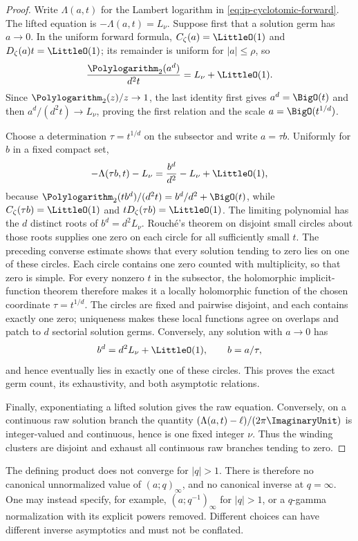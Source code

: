 \begin{proof}
Write \(\Lambda(a,t)\) for the Lambert logarithm in
\cref{eq:ip-cyclotomic-forward}.  The lifted equation is
\(-\Lambda(a,t)=L_\nu\).  Suppose first that a solution germ has
\(a\to0\).  In the uniform forward formula,
\(C_\zeta(a)=\LittleO(1)\) and \(D_\zeta(a)t=\LittleO(1)\); its remainder is
uniform for \(|a|\leq\rho\), so
\[
 \frac{\Polylogarithm_2(a^d)}{d^2t}=L_\nu+\LittleO(1).
\]
Since \(\Polylogarithm_2(z)/z\to1\), the last identity first gives
\(a^d=\BigO(t)\) and then
\(a^d/(d^2t)\to L_\nu\), proving the first relation and the scale
\(a=\BigO(t^{1/d})\).

Choose a determination \(\tau=t^{1/d}\) on the subsector and write
\(a=\tau b\).  Uniformly for \(b\) in a fixed compact set,
\[
 -\Lambda(\tau b,t)-L_\nu
 =\frac{b^d}{d^2}-L_\nu+\LittleO(1),
\]
because
\(\Polylogarithm_2(tb^d)/(d^2t)=b^d/d^2+\BigO(t)\), while
\(C_\zeta(\tau b)=\LittleO(1)\) and
\(tD_\zeta(\tau b)=\LittleO(1)\).  The limiting polynomial has the
\(d\) distinct roots of \(b^d=d^2L_\nu\).  Rouché's theorem on disjoint
small circles about those roots supplies one zero on each circle for all
sufficiently small \(t\).  The preceding converse estimate shows that every
solution tending to zero lies on one of these circles.  Each circle contains
one zero counted with multiplicity, so that zero is simple.  For every
nonzero \(t\) in the subsector, the holomorphic implicit-function theorem
therefore makes it a locally holomorphic function of the chosen coordinate
\(\tau=t^{1/d}\).  The circles are fixed and pairwise disjoint, and each
contains exactly one zero; uniqueness makes these local functions agree on
overlaps and patch to \(d\) sectorial solution germs.  Conversely, any
solution with \(a\to0\) has
\[
 b^d=d^2L_\nu+\LittleO(1),\qquad b=a/\tau,
\]
and hence eventually lies in exactly one of these circles.  This proves the
exact germ count, its exhaustivity, and both asymptotic relations.

Finally, exponentiating a lifted solution gives the raw equation.  Conversely,
on a continuous raw solution branch the quantity
\((\Lambda(a,t)-\ell)/(2\pi\ImaginaryUnit)\) is integer-valued and continuous,
hence is one fixed integer \(\nu\).  Thus the winding clusters are disjoint
and exhaust all continuous raw branches tending to zero.
\end{proof}

\begin{warning}
The defining product does not converge for \(|q|>1\).  There is therefore no
canonical unnormalized value of \((a;q)_\infty\), and no canonical inverse at
\(q=\infty\).  One may instead specify, for example,
\((a;q^{-1})_\infty\) for \(|q|>1\), or a \(q\)-gamma normalization with its
explicit powers removed.  Different choices can have different inverse
asymptotics and must not be conflated.
\end{warning}
